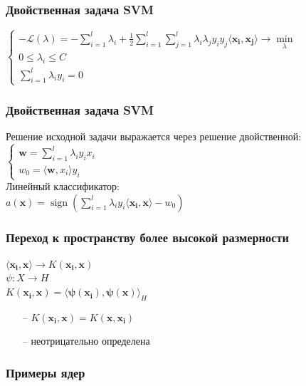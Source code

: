 \documentclass[12pt]{beamer}
\DeclareMathOperator{\sign}{sign}
\begin{document}
\begin{frame}\frametitle{Двойственная задача SVM}
$\begin{cases}
-\mathcal{L}(\lambda) = - \sum\limits_{i = 1}^l \lambda_i  + \frac{1}{2} \sum\limits_{i = 1}^l\sum\limits_{j = 1}^l \lambda_i \lambda_j y_iy_j \langle \mathbf{x_i}, \mathbf{x_j} \rangle \rightarrow \min\limits_{\lambda}\\
0 \leq \lambda_i \leq C\\
\sum\limits_{i=1}^l \lambda_iy_i = 0
\end{cases}$\\
\end{frame}

\begin{frame}\frametitle{Двойственная задача SVM}

Решение исходной задачи выражается через решение двойственной:\\
$\begin{cases}
\mathbf{w} = \sum\limits_{i = 1}^l \lambda_iy_ix_i\\
w_0 = \langle \mathbf{w}, x_i \rangle y_i
\end{cases}$\\
\vspace{5mm}
Линейный классификатор:\\
$a(\mathbf{x}) = \sign(\sum\limits_{i=1}^l \lambda_iy_i \langle \mathbf{x_i}, \mathbf{x} \rangle - w_0)$

\end{frame}

\begin{frame}\frametitle{Переход к пространству более высокой размерности}
$\langle \mathbf{x_i}, \mathbf{x} \rangle \rightarrow K(\mathbf{x_i}, \mathbf{x})$\\
\vspace{5mm}
$\psi: X \rightarrow H$\\
$K(\mathbf{x_i}, \mathbf{x}) = \langle \mathbf{\psi(x_i)}, \mathbf{\psi(x)} \rangle_H$
\begin{itemize}
\item[--] $K(\mathbf{x_i}, \mathbf{x}) = K(\mathbf{x}, \mathbf{x_i})$
\item[--] неотрицательно определена
\end{itemize}
\end{frame}

\begin{frame}\frametitle{Примеры ядер}
\end{frame}
\end{document}
